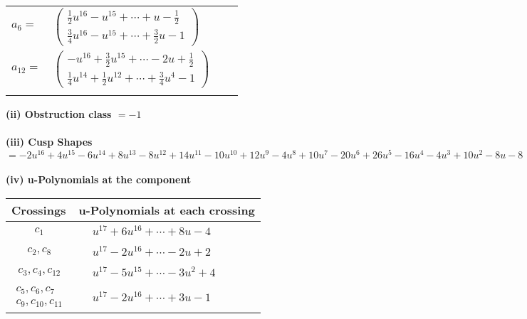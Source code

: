 \documentclass[1p]{elsarticle_modified}
\theoremstyle{definition}
\begin{document}
\begin{tabular}{m{7pt} m{180pt} m{7pt} m{180pt} }
\flushright $a_{6}=$&$\begin{pmatrix}\frac{1}{2} u^{16}- u^{15}+\cdots+u-\frac{1}{2}\\\frac{3}{4} u^{16}- u^{15}+\cdots+\frac{3}{2} u-1\end{pmatrix}$ \\
\flushright $a_{12}=$&$\begin{pmatrix}- u^{16}+\frac{3}{2} u^{15}+\cdots-2 u+\frac{1}{2}\\\frac{1}{4} u^{14}+\frac{1}{2} u^{12}+\cdots+\frac{3}{4} u^4-1\end{pmatrix}$\\&\end{tabular}
\flushleft \textbf{(ii) Obstruction class $= -1$}\\~\\
\flushleft \textbf{(iii) Cusp Shapes $= -2 u^{16}+4 u^{15}-6 u^{14}+8 u^{13}-8 u^{12}+14 u^{11}-10 u^{10}+12 u^9-4 u^8+10 u^7-20 u^6+26 u^5-16 u^4-4 u^3+10 u^2-8 u-8$}\\~\\
\newpage\renewcommand{\arraystretch}{1}
\flushleft \textbf{(iv) u-Polynomials at the component}\newline \\
\begin{tabular}{m{50pt}|m{274pt}}
Crossings & \hspace{64pt}u-Polynomials at each crossing \\
\hline $$\begin{aligned}c_{1}\end{aligned}$$&$\begin{aligned}
&u^{17}+6 u^{16}+\cdots+8 u-4
\end{aligned}$\\
\hline $$\begin{aligned}c_{2},c_{8}\end{aligned}$$&$\begin{aligned}
&u^{17}-2 u^{16}+\cdots-2 u+2
\end{aligned}$\\
\hline $$\begin{aligned}c_{3},c_{4},c_{12}\end{aligned}$$&$\begin{aligned}
&u^{17}-5 u^{15}+\cdots-3 u^2+4
\end{aligned}$\\
\hline $$\begin{aligned}c_{5},c_{6},c_{7}\\c_{9},c_{10},c_{11}\end{aligned}$$&$\begin{aligned}
&u^{17}-2 u^{16}+\cdots+3 u-1
\end{aligned}$\\
\hline
\end{tabular}\\~\\
\end{document}
